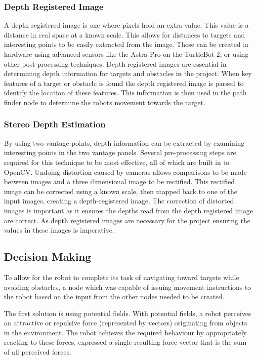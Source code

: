 \documentclass{article}[12]
\begin{document}
		\subsubsection{Depth Registered Image}

A depth registered image is one where pixels hold an extra value. This value is a distance in real space at a known scale. This allows for distances to targets and interesting points to be easily extracted from the image. These can be created in hardware using advanced sensors like the Astra Pro on the TurtleBot 2, or using other post-processing techniques. Depth registered images are essential in determining depth information for targets and obstacles in the project. When key features of a target or obstacle is found the depth registered image is parsed to identify the location of these features. This information is then used in the path finder node to determine the robots movement towards the target.   
		
		\subsubsection{Stereo Depth Estimation}
		
		By using two vantage points, depth information can be extracted by examining interesting points in the two vantage panels. Several pre-processing steps are required for this technique to be most effective, all of which are built in to OpenCV. Undoing distortion caused by cameras allows comparisons to be made between images and a three dimensional image to be rectified. This rectified image can be corrected using a known scale, then mapped back to one of the input images, creating a depth-registered image. The correction of distorted images is important as it ensures the depths read from the depth registered image are correct. As depth registered images are necessary for the project ensuring the values in these images is imperative.
		
	
	\subsection{Decision Making}
	
	To allow for the robot to complete its task of navigating toward targets while avoiding obstacles, a node which was capable of issuing movement instructions to the robot based on the input from the other nodes needed to be created. 
	
The first solution is using potential fields. With potential fields, a robot perceives an attractive or repulsive force (represented by vectors) originating from objects in the environment. The robot achieves the required behaviour by appropriately reacting to these forces, expressed a single resulting force vector that is the sum of all perceived forces. \cite{hwang1992potential}
\end{document}
